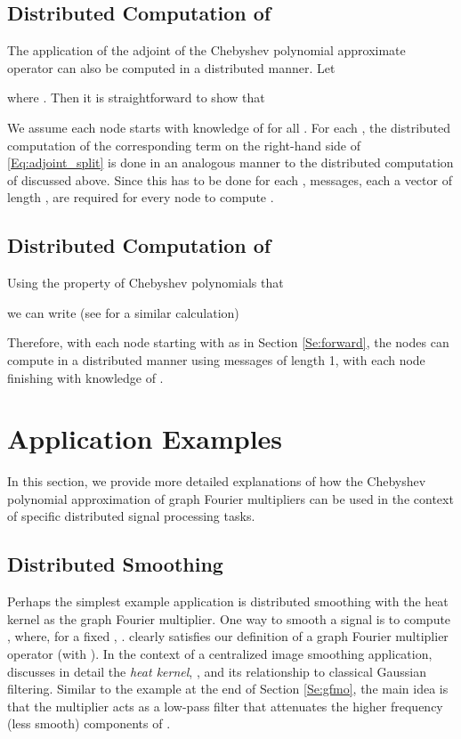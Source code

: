 \documentclass[conference]{IEEEtran}
\begin{document}
\subsection{Distributed Computation of } \label{Se:adj_d}
The application of the adjoint  of the Chebyshev polynomial approximate operator  can also be computed in a distributed manner. Let

where . Then it is straightforward to show that

We assume each node  starts with knowledge of  for all . For each , the distributed computation of the corresponding term on the right-hand side of \eqref{Eq:adjoint_split} is done in an analogous manner to the distributed computation of  discussed above. Since this has to be done for each ,  messages, each a vector of length , are required for every node  to compute .

\subsection{Distributed Computation of }\label{Se:wwstar} Using the property of Chebyshev polynomials that

we can write (see \cite{LTS-ARTICLE-2009-053} for a similar calculation)

Therefore, with each node  starting with  as in Section \ref{Se:forward}, the nodes can compute  in a distributed manner using  messages of length 1, with each node  finishing with knowledge of .











\section{Application Examples}\label{Se:applications}
In this section, we provide more detailed explanations of how the Chebyshev polynomial approximation of graph Fourier multipliers can be used in the context of specific distributed signal processing tasks.
\subsection{Distributed Smoothing}
Perhaps the simplest example application is distributed smoothing with the heat kernel as the graph Fourier multiplier. One way to smooth a signal  is to compute , where, for a fixed ,
.
 clearly satisfies our definition of a graph Fourier multiplier operator (with ).
In the context of a centralized image smoothing application, \cite{hancock} discusses in detail the \emph{heat kernel}, , and its relationship to classical Gaussian filtering. Similar to the example at the end of Section \ref{Se:gfmo}, the main idea is that the multiplier  acts as a low-pass filter that attenuates the higher frequency (less smooth) components of .
\end{document}
